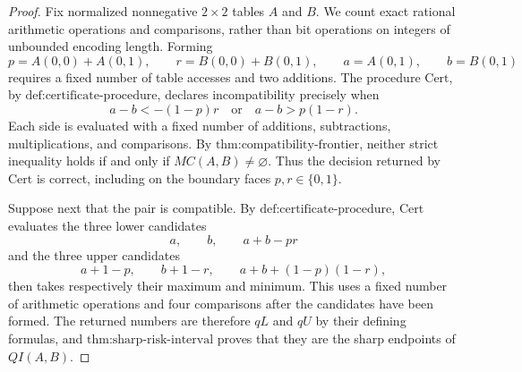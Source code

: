 \documentclass{article}
\begin{document}
\begin{proof}
Fix normalized nonnegative \(2\times2\) tables \(A\) and \(B\).  We count exact rational arithmetic operations and comparisons, rather than bit operations on integers of unbounded encoding length.  Forming
\[
p=A(0,0)+A(0,1),\qquad r=B(0,0)+B(0,1),\qquad a=A(0,1),\qquad b=B(0,1)
\]
requires a fixed number of table accesses and two additions.  The procedure \(\mathrm{Cert}\), by \(\text{def:certificate-procedure}\), declares incompatibility precisely when
\[
a-b<-(1-p)r\quad\text{or}\quad a-b>p(1-r).
\]
Each side is evaluated with a fixed number of additions, subtractions, multiplications, and comparisons.  By \(\text{thm:compatibility-frontier}\), neither strict inequality holds if and only if \(MC(A,B)\neq\varnothing\).  Thus the decision returned by \(\mathrm{Cert}\) is correct, including on the boundary faces \(p,r\in\{0,1\}\).

Suppose next that the pair is compatible.  By \(\text{def:certificate-procedure}\), \(\mathrm{Cert}\) evaluates the three lower candidates
\[
a,\qquad b,\qquad a+b-pr
\]
and the three upper candidates
\[
a+1-p,\qquad b+1-r,\qquad a+b+(1-p)(1-r),
\]
then takes respectively their maximum and minimum.  This uses a fixed number of arithmetic operations and four comparisons after the candidates have been formed.  The returned numbers are therefore \(qL\) and \(qU\) by their defining formulas, and \(\text{thm:sharp-risk-interval}\) proves that they are the sharp endpoints of \(QI(A,B)\).


\end{proof}
\end{document}
